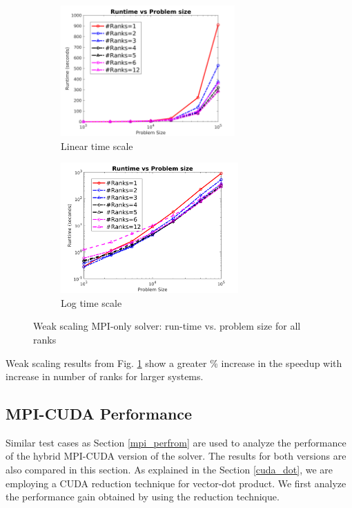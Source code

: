 \documentclass[sigplan,screen]{acmart}
\begin{document}
\begin{figure}
	\begin{subfigure}{0.35\textwidth}
		\includegraphics[trim= 10 5 35 10,clip, width=0.95\linewidth, height=5cm]{MPI_weak_allrank.png} 
		\caption{Linear time scale}
	\end{subfigure}
	\begin{subfigure}{0.35\textwidth}
		\includegraphics[trim= 10 5 35 10,clip, width=0.95\linewidth, height=5cm]{MPI_weak_allrank_loglog.png}
		\caption{Log time scale}
	\end{subfigure}
	\caption{Weak scaling MPI-only solver: run-time vs. problem size for all ranks}
	\label{weak}
\end{figure}

Weak scaling results from Fig. \ref{weak} show a greater \% increase in the speedup with increase in number of ranks for larger systems. 

\subsection{MPI-CUDA Performance}
Similar test cases as Section \ref{mpi_perfrom} are used to analyze the performance of the hybrid MPI-CUDA version of the solver. The results for both versions are also compared in this section. As explained in the Section \ref{cuda_dot}, we are employing a CUDA reduction technique for vector-dot product. We first analyze the performance gain obtained by using the reduction technique. 
\end{document}
